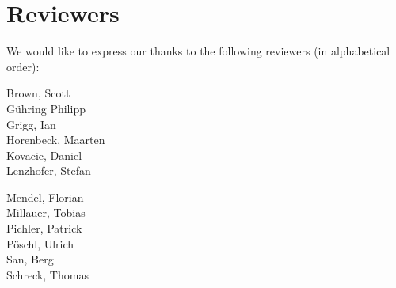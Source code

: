 \section{Reviewers}
\label{section:Reviewers}

We would like to express our thanks to the following reviewers (in alphabetical order):


\vline{}

\begin{minipage}[b]{0.5\linewidth}
\center
Brown, Scott \\
G\"uhring Philipp  \\
Grigg, Ian  \\
Horenbeck, Maarten \\
Kovacic, Daniel \\
Lenzhofer, Stefan \\
\end{minipage}
\begin{minipage}[b]{0.5\linewidth}
\center
Mendel, Florian \\
Millauer, Tobias \\
Pichler, Patrick \\
P\"oschl, Ulrich \\
San, Berg \\
Schreck, Thomas  \\
\end{minipage}




